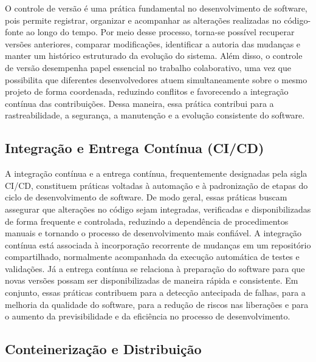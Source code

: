 \documentclass[grad,pdftex]{poli}
\begin{document}
O controle de versão é uma prática fundamental no desenvolvimento de software, pois permite registrar, organizar e acompanhar as alterações realizadas no código-fonte ao longo do tempo. Por meio desse processo, torna-se possível recuperar versões anteriores, comparar modificações, identificar a autoria das mudanças e manter um histórico estruturado da evolução do sistema. Além disso, o controle de versão desempenha papel essencial no trabalho colaborativo, uma vez que possibilita que diferentes desenvolvedores atuem simultaneamente sobre o mesmo projeto de forma coordenada, reduzindo conflitos e favorecendo a integração contínua das contribuições. Dessa maneira, essa prática contribui para a rastreabilidade, a segurança, a manutenção e a evolução consistente do software.


\subsection{Integração e Entrega Contínua (CI/CD)}

A integração contínua e a entrega contínua, frequentemente designadas pela sigla CI/CD, constituem práticas voltadas à automação e à padronização de etapas do ciclo de desenvolvimento de software. De modo geral, essas práticas buscam assegurar que alterações no código sejam integradas, verificadas e disponibilizadas de forma frequente e controlada, reduzindo a dependência de procedimentos manuais e tornando o processo de desenvolvimento mais confiável. A integração contínua está associada à incorporação recorrente de mudanças em um repositório compartilhado, normalmente acompanhada da execução automática de testes e validações. Já a entrega contínua se relaciona à preparação do software para que novas versões possam ser disponibilizadas de maneira rápida e consistente. Em conjunto, essas práticas contribuem para a detecção antecipada de falhas, para a melhoria da qualidade do software, para a redução de riscos nas liberações e para o aumento da previsibilidade e da eficiência no processo de desenvolvimento.

\subsection{Conteinerização e Distribuição }
\end{document}
